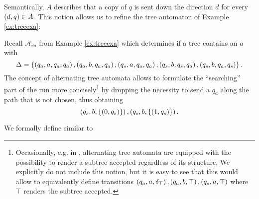 Semantically, $A$ describes that a copy of $q$ is sent down the direction $d$ 
for every $\left(d,q\right)\in A$. This notion allows us to refine the tree 
automaton of Example \ref{ex:treeexa}:
\begin{example}
  Recall $\mathcal{A}_{\exists a}$ from Example \ref{ex:treeexa} which
  determines if a tree contains an $a$ with 
  \begin{equation*}
    \Delta = \left\{
      \left(q_{a}, a, q_{a}, q_{a}\right),
      \left(q_{a}, b, q_{a}, q_{a}\right),
      \left(q_{s}, a, q_{a}, q_{a}\right),
      \left(q_{s}, b, q_{s}, q_{a}\right),
      \left(q_{s}, b, q_{a}, q_{s}\right)
    \right\}.
  \end{equation*}
  The concept of alternating tree automata allows to formulate the
  \enquote{searching} part of the run more concisely\footnote{
    Occasionally, e.g. in \cite[Chapter 9]{AutoLogInfGames}, alternating tree
    automata are equipped with the possibility to render a subtree accepted 
    regardless of its structure. We explicitly do not include this notion, but 
    it is easy to see that this would allow to equivalently define transitions
    $\left(q_{a}, a, \delta_{\top}\right),\left(q_{a}, b, \top\right),
    \left(q_{s}, a, \top\right)$ where $\top$ renders the subtree accepted.
  }
  by dropping the necessity to send a $q_{a}$ along the
  path that is not chosen, thus obtaining
  \begin{equation*}
    \left(q_{s}, b, \left\{\left(0, q_{s}\right)\right\}\right),
    \left(q_{s}, b, \left\{\left(1, q_{s}\right)\right\}\right).
  \end{equation*}
\end{example}
We formally define similar to \cite{SynProbEnv}
